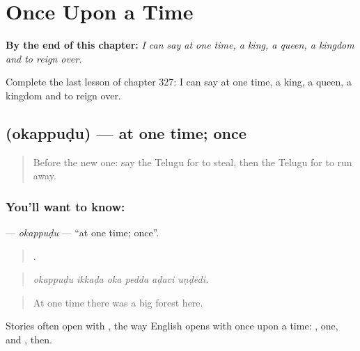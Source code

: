 
\chapter{Once Upon a Time}
\label{ch:te-once-upon-a-time}

\begin{chapteropening}
\textbf{By the end of this chapter:} \emph{I can say at one time, a king, a queen, a kingdom and to reign over.}

Complete the last lesson of chapter 327: I can say at one time, a king, a queen, a kingdom and to reign over.
\end{chapteropening}

\section[\texorpdfstring{\te{ఒకప్పుడు} (okappuḍu)}{ఒకప్పుడు (okappuḍu)}]{ (okappuḍu) — at one time; once}

\label{lesson:TE-C327-okappudu}



\begin{quote}
Before the new one: say the Telugu for to steal, then the Telugu for to run away.
\end{quote}

\subsection*{You'll want to know: }
\textbf{} — \emph{okappuḍu} — \textquotedblleft{}at one time; once\textquotedblright{}.

\begin{quote}
     .
\end{quote}

\begin{quote}
\emph{okappuḍu ikkaḍa oka pedda aḍavi uṇḍēdi.}
\end{quote}

\begin{quote}
At one time there was a big forest here.
\end{quote}

Stories often open with , the way English opens with once upon a time: , one, and , then.

